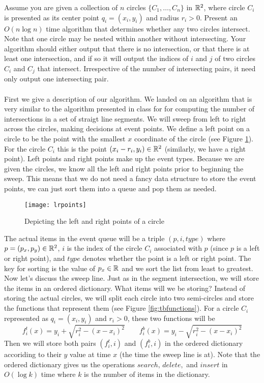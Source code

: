 \documentclass[11pt]{article}
\begin{document}
Assume you are given a collection of $n$ circles $\{C_1 , \ldots , C_n \}$ in
$\mathbb{R}^2$, where circle $C_i$ is presented as its center point $q_i = (x_i, y_i)$
and radius $r_i > 0$. Present an $O(n \log n)$ time algorithm that determines
whether any two circles intersect. Note that one circle may be nested within
another without intersecting. Your algorithm should either output
that there is no intersection, or that there is at least one intersection, and
if so it will output the indices of $i$ and $j$ of two circles $C_i$ and $C_j$
that intersect. Irrespective of the number of intersecting pairs, it need only
output one intersecting pair. \\\\
\answer
First we give a description of our algorithm.
We landed on an algorithm that is very similar to the algorithm presented in class for for computing the number of intersections in a set of straigt line segments.
We will sweep from left to right across the circles, making decisions at event points.
We define a left point on a circle to be the point with the smallest $x$ coordinate of the circle (see Figure \ref{fig:lrpoints}).
For the circle $C_i$ this is the point $(x_i - r_i, y_i) \in \mathbb{R} ^2$ (similarly, we have a right point).
Left points and right points make up the event types.
Because we are given the circles, we know all the left and right points prior to beginning the sweep.
This means that we do not need a fancy data structure to store the event points, we can just sort them into a queue and pop them as needed.

\begin{figure}[h]
   \centering
   \texttt{[image: lrpoints]}
   \caption{Depicting the left and right points of a circle}
   \label{fig:lrpoints}
\end{figure}

The actual items in the event queue will be a triple $(p, i, type)$ where $p = (p_x, p_y) \in \mathbb{R} ^2$, $i$ is the index of the circle $C_i$ associated with $p$ (since $p$ is a left or right point), and $type$ denotes whether the point is a left or right point.
The key for sorting is the value of $p_x \in \mathbb{R}$ and we sort the list from least to greatest.
Now let's discuss the sweep line.
Just as in the segment intersection, we will store the items in an ordered dictionary.
What items will we be storing?
Instead of storing the actual circles, we will split each circle into two semi-circles and store the functions that represent them (see Figure \ref{fig:tbfunctions}).
For a circle $C_i$ represented as $q_i = (x_i, y_i)$ and $r_i > 0$, these two functions will be
$$ f_i^t (x) = y_i + \sqrt{r_i^2 - (x - x_i)^2} \hspace{2em} f_i^b (x) = y_i - \sqrt{r_i^2 - (x - x_i)^2} $$
Then we will store both pairs $(f_i^t, i)$ and $(f_i^b, i)$ in the ordered dictionary accoriding to their $y$ value at time $x$ (the time the sweep line is at).
Note that the ordered dictionary gives us the operations $search,\, delete,$ and $insert$ in $O(\log k)$ time where $k$ is the number of items in the dictionary.
\end{document}

